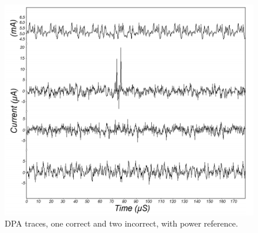 \documentclass{article}
\begin{document}
\begin{figure}
\includegraphics[scale=.7]{dpaTrace}
\caption{DPA traces, one correct and two incorrect, with power reference.}
\label{fig:dpa trace}
\end{figure}


\end{document}
